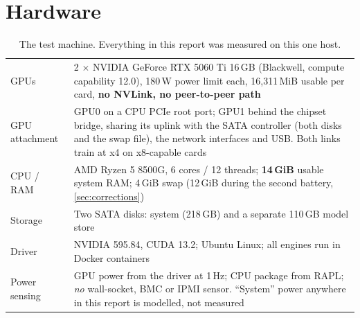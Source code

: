 \section{Hardware}\label{sec:hardware}

\begin{table}[t]
\centering\small
\caption{The test machine. Everything in this report was measured on this one host.}\label{tab:host}
\begin{tabularx}{\linewidth}{@{}lX@{}}
\toprule
GPUs & 2 $\times$ NVIDIA GeForce RTX 5060 Ti 16\,GB (Blackwell, compute capability 12.0), 180\,W power
limit each, 16{,}311\,MiB usable per card, \textbf{no NVLink, no peer-to-peer path} \\
GPU attachment & GPU0 on a CPU PCIe root port; GPU1 behind the chipset bridge, sharing its uplink with
the SATA controller (both disks and the swap file), the network interfaces and USB. Both links train
at x4 on x8-capable cards \\
CPU / RAM & AMD Ryzen 5 8500G, 6 cores / 12 threads; \textbf{14\,GiB} usable system RAM; 4\,GiB swap
(12\,GiB during the second battery, \cref{sec:corrections}) \\
Storage & Two SATA disks: system (218\,GB) and a separate 110\,GB model store \\
Driver & NVIDIA 595.84, CUDA 13.2; Ubuntu Linux; all engines run in Docker containers \\
Power sensing & GPU power from the driver at 1\,Hz; CPU package from RAPL; \emph{no} wall-socket, BMC
or IPMI sensor. ``System'' power anywhere in this report is modelled, not measured \\
\bottomrule
\end{tabularx}
\end{table}

